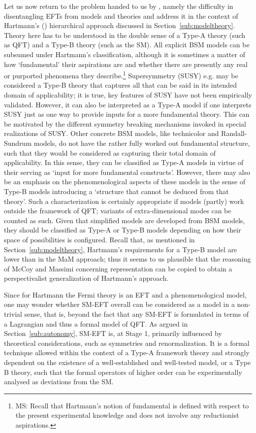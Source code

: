 Let us now return to the problem handed to us by \citet{hartmann2001}, namely the difficulty in disentangling EFTs from models and theories and address it in the context of Hartmann's (\citeyear{hartmann95}) hierarchical approach discussed in Section~\ref{sub:modeltheory}. 
Theory here has to be understood in the double sense of a Type-A theory (such as QFT) and a Type-B theory (such as the SM). 
All explicit BSM models can be subsumed under Hartmann's classification, although it is sometimes a matter of how `fundamental' their aspirations are and whether there are presently any real or purported phenomena they describe.\footnote{MS: Recall that Hartmann's notion of fundamental is defined with respect to the present experimental knowledge and does not involve any reductionist aspirations.}
Supersymmetry (SUSY) e.g. may be considered a Type-B theory %
that captures all that can be said in its intended domain of applicability; it is true, key features of SUSY have not been empirically validated. 
However, it can also be interpreted as a Type-A model if one interprets SUSY just as one way to provide inputs for a more fundamental theory. 
This can be motivated by the different symmetry breaking mechanisms invoked in special realizations of SUSY. 
Other concrete BSM models, like technicolor and Randall-Sundrum models, do not have the rather fully worked out fundamental structure, such that they would be considered as capturing their total domain of applicability. 
In this sense, they can be classified as Type-A models in virtue of their serving as `input for more fundamental constructs'. 
However, there may also be an emphasis on the phenomenological aspects of these models in the sense of Type-B models introducing a `structure that cannot be deduced from that theory'. 
Such a characterization is certainly appropriate if models (partly) work outside the framework of QFT; variants of extra-dimensional modes can be counted as such. 
Given that simplified models are developed from BSM models, they should be classified as Type-A or Type-B models depending on how their space of possibilities is configured.
Recall that, as mentioned in Section~\ref{sub:modeltheory}, Hartmann's requirements for a Type-B model are lower than in the MaM approach; thus it seems to us plausible that the reasoning of McCoy and Massimi concerning representation can be copied to obtain a perspectivalist generalization of Hartmann's approach.

Since for Hartmann the Fermi theory is an EFT and a phenomenological model, one may wonder whether SM-EFT overall can be considered as a model in a non-trivial sense, that is, beyond the fact that any SM-EFT is formulated in terms of a Lagrangian and thus a formal model of QFT.
As argued in Section~\ref{sub:autonomy}, SM-EFT is, at Stage 1, primarily influenced by theoretical considerations, such as symmetries and renormalization. 
It is a formal technique allowed within the context of a Type-A framework theory and strongly dependent on the existence of a well-established and well-tested model, or a Type B theory, such that the formal operators of higher order can be experimentally analysed as deviations from the SM. 

